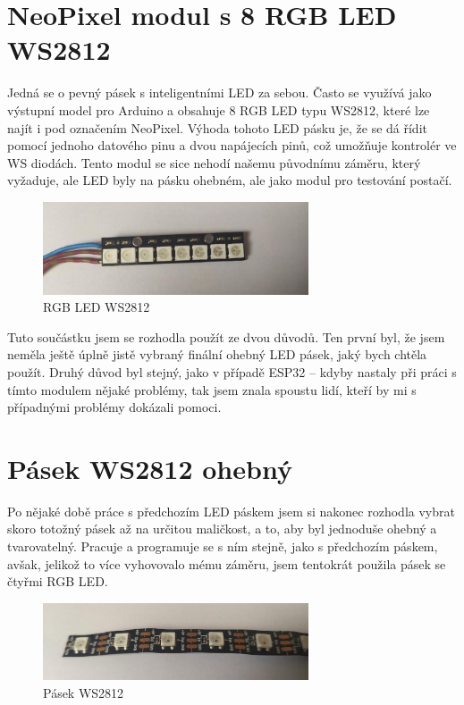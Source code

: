 \section{NeoPixel modul s 8 RGB LED WS2812}
Jedná se o pevný pásek s inteligentními LED za sebou. Často se využívá jako výstupní model pro Arduino a obsahuje 8 RGB LED typu WS2812, které lze najít i pod označením NeoPixel. Výhoda tohoto LED pásku je, že se dá řídit pomocí jednoho datového pinu a dvou napájecích pinů, což umožňuje kontrolér ve WS diodách. Tento modul se sice nehodí našemu původnímu záměru, který vyžaduje, ale LED byly na pásku ohebném, ale jako modul pro testování postačí.

\begin{figure}[htbp]
	\centering
	\includegraphics[width=0.7\textwidth]{img/NeoPixel2.jpg}
	\caption{RGB LED WS2812}
\end{figure}

Tuto součástku jsem se rozhodla použít ze dvou důvodů. Ten první byl, že jsem neměla ještě úplně jistě vybraný finální ohebný LED pásek, jaký bych chtěla použít. Druhý důvod byl stejný, jako v případě ESP32 -- kdyby nastaly při práci s tímto modulem nějaké problémy, tak jsem znala spoustu lidí, kteří by mi s případnými problémy dokázali pomoci. 


\section{Pásek WS2812 ohebný}
Po nějaké době práce s předchozím LED páskem jsem si nakonec rozhodla vybrat skoro totožný pásek až na určitou maličkost, a to, aby byl jednoduše ohebný a tvarovatelný. Pracuje a programuje se s ním stejně, jako s předchozím páskem, avšak, jelikož to více vyhovovalo mému záměru, jsem tentokrát použila pásek se čtyřmi RGB LED. 


\begin{figure}[htbp]
	\centering
	\includegraphics[width=0.7\textwidth]{img/OhebnyLedPasek2.jpg}
	\caption{Pásek WS2812}
\end{figure}


